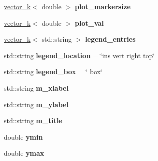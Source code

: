 \begin{DoxyCompactItemize}
\item 
\hypertarget{classkeycpp_1_1_plots_a6875dffbe632094e898e907acfdf865d}{\hyperlink{classkeycpp_1_1vector__k}{vector\-\_\-k}$<$ double $>$ {\bfseries plot\-\_\-markersize}}\label{classkeycpp_1_1_plots_a6875dffbe632094e898e907acfdf865d}

\item 
\hypertarget{classkeycpp_1_1_plots_ab67ed9d8c321380f223baea8f05630ed}{\hyperlink{classkeycpp_1_1vector__k}{vector\-\_\-k}$<$ double $>$ {\bfseries plot\-\_\-val}}\label{classkeycpp_1_1_plots_ab67ed9d8c321380f223baea8f05630ed}

\item 
\hypertarget{classkeycpp_1_1_plots_ac1ead832f730af660bdb00e19da307e0}{\hyperlink{classkeycpp_1_1vector__k}{vector\-\_\-k}$<$ std\-::string $>$ {\bfseries legend\-\_\-entries}}\label{classkeycpp_1_1_plots_ac1ead832f730af660bdb00e19da307e0}

\item 
\hypertarget{classkeycpp_1_1_plots_add620558a2e9a243a95ffdfe7489897b}{std\-::string {\bfseries legend\-\_\-location} = \char`\"{}ins vert right top\char`\"{}}\label{classkeycpp_1_1_plots_add620558a2e9a243a95ffdfe7489897b}

\item 
\hypertarget{classkeycpp_1_1_plots_ab3c932242df0fa03798ecfd2dba3ebaa}{std\-::string {\bfseries legend\-\_\-box} = \char`\"{} box\char`\"{}}\label{classkeycpp_1_1_plots_ab3c932242df0fa03798ecfd2dba3ebaa}

\item 
\hypertarget{classkeycpp_1_1_plots_a18a69c533594b4bc1c88fdb29267db1e}{std\-::string {\bfseries m\-\_\-xlabel}}\label{classkeycpp_1_1_plots_a18a69c533594b4bc1c88fdb29267db1e}

\item 
\hypertarget{classkeycpp_1_1_plots_ad2987af367059a0659e013708342451b}{std\-::string {\bfseries m\-\_\-ylabel}}\label{classkeycpp_1_1_plots_ad2987af367059a0659e013708342451b}

\item 
\hypertarget{classkeycpp_1_1_plots_a849d297c44ebca4f7c856c99cfcc2b5f}{std\-::string {\bfseries m\-\_\-title}}\label{classkeycpp_1_1_plots_a849d297c44ebca4f7c856c99cfcc2b5f}

\item 
\hypertarget{classkeycpp_1_1_plots_a54578198c41d34705e9fbe94a88ec6ae}{double {\bfseries ymin}}\label{classkeycpp_1_1_plots_a54578198c41d34705e9fbe94a88ec6ae}

\item 
\hypertarget{classkeycpp_1_1_plots_ad411158572c6ee36b1f4abc9c9dfec77}{double {\bfseries ymax}}\label{classkeycpp_1_1_plots_ad411158572c6ee36b1f4abc9c9dfec77}


\end{DoxyCompactItemize}
